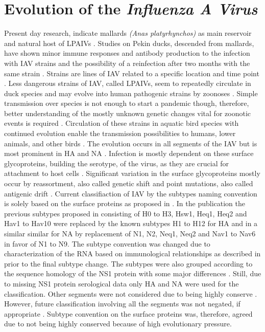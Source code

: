 \section{Evolution of the \textit{Influenza A Virus}}

Present day research, indicate mallards \textit{(Anas platyrhynchos)} as main reservoir and natural host of \glspl{LPAIV} \autocite{jourdain_influenza_2010}. Studies on Pekin ducks, descended from mallards, have shown minor immune responses and antibody production to the infection with \gls{IAV} strains and the possibility of a reinfection after two months with the same strain \autocite{kida_duck_1980}. Strains are lines of \gls{IAV} related to a specific location and time point \autocite{cann_chapter_2016}. Less dangerous strains of \gls{IAV}, called \glspl{LPAIV}, seem to repeatedly circulate in duck species and may evolve into human pathogenic strains by zoonoses \autocite{jourdain_influenza_2010}. Simple transmission over species is not enough to start a pandemic though, therefore, better understanding of the mostly unknown genetic changes vital for zoonotic events is required \autocite{van_reeth_avian_2007}. Circulation of these strains in aquatic bird species with continued evolution enable the transmission possibilities to humans, lower animals, and other birds \autocite{webster_chapter_1999}. The evolution occurs in all segments of the \gls{IAV} but is most prominent in \gls{HA} and \gls{NA} \autocite{webster_chapter_1999}. Infection is mostly dependent on these surface glycoproteins, building the serotype, of the virus, as they are crucial for attachment to host cells \autocite{cann_chapter_2016}. Significant variation in the surface glycoproteins mostly occur by reassortment, also called genetic shift and point mutations, also called antigenic drift \autocite{webster_chapter_1999}. Current classifiaction of \gls{IAV} by the subtypes naming convention is solely based on the surface proteins as proposed in \textcite{noauthor_revision_1980}. In the publication the previous subtypes proposed in \textcite{noauthor_revised_1971} consisting of H0 to H3, Hsw1, Heq1, Heq2 and Hav1 to Hav10 were replaced by the known subtypes H1 to H12 for \gls{HA} and in a similar similar for \gls{NA} by replacement of N1, N2, Neq1, Neq2 and Nav1 to Nav6 in favor of N1 to N9. The subtype convention was changed due to characterization of the RNA based on immunological relationships as described in \textcite{noauthor_reconsideration_1979} prior to the final subtype change. The subtypes were also grouped according to the sequence homology of the \gls{NS1} protein with some major differences \autocite{noauthor_reconsideration_1979}. Still, due to missing \gls{NS1} protein serological data only \gls{HA} and \gls{NA} were used for the classification. Other segments were not considered due to being highly conserve \autocite{noauthor_reconsideration_1979}. However, future classification involving all the segments was not negated, if appropriate \autocite{noauthor_reconsideration_1979}. Subtype convention on the surface proteins was, therefore, agreed due to not being highly conserved because of high evolutionary pressure.

